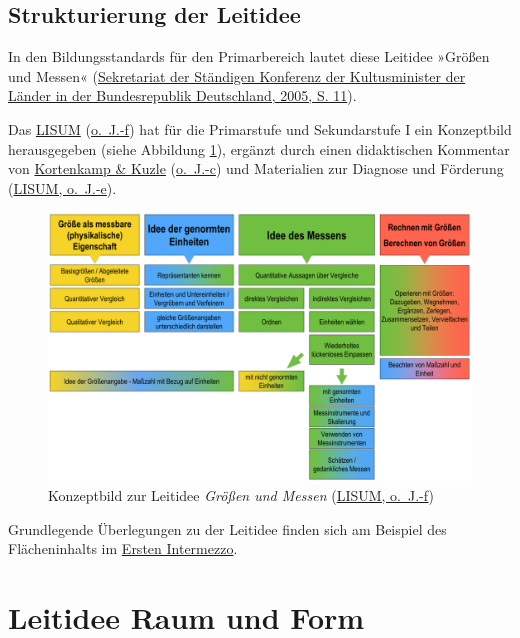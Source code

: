 \documentclass[
  ngerman,
]{scrbook}
\theoremstyle{definition}
\theoremstyle{definition}
\theoremstyle{definition}
\theoremstyle{definition}
\theoremstyle{remark}
\begin{document}
\hypertarget{strukturierung-der-leitidee-messen}{%
\section{Strukturierung der Leitidee}\label{strukturierung-der-leitidee-messen}}

In den Bildungsstandards für den Primarbereich lautet diese Leitidee »Größen und Messen« (\protect\hyperlink{ref-KMK2005}{Sekretariat der Ständigen Konferenz der Kultusminister der Länder in der Bundesrepublik Deutschland, 2005, S. 11}).

Das \protect\hyperlink{ref-LISUMf}{LISUM} (\protect\hyperlink{ref-LISUMf}{o.~J.-f}) hat für die Primarstufe und Sekundarstufe I ein Konzeptbild herausgegeben (siehe Abbildung \ref{fig:KonzeptMessen}), ergänzt durch einen didaktischen Kommentar von \protect\hyperlink{ref-Kortenkampb}{Kortenkamp \& Kuzle} (\protect\hyperlink{ref-Kortenkampb}{o.~J.-c}) und Materialien zur Diagnose und Förderung (\protect\hyperlink{ref-LISUMe}{LISUM, o.~J.-e}).



\begin{figure}

{\centering \includegraphics[width=0.9\linewidth]{pictures/B-KonzeptMessen} 

}

\caption{Konzeptbild zur Leitidee \emph{Größen und Messen} (\protect\hyperlink{ref-LISUMf}{LISUM, o.~J.-f})}\label{fig:KonzeptMessen}
\end{figure}

Grundlegende Überlegungen zu der Leitidee finden sich am Beispiel des Flächeninhalts im \protect\hyperlink{erstes-intermezzo-flaecheninhalt}{Ersten Intermezzo}.

\hypertarget{leitidee-raum-und-form}{%
\chapter{Leitidee Raum und Form}\label{leitidee-raum-und-form}}
\end{document}
